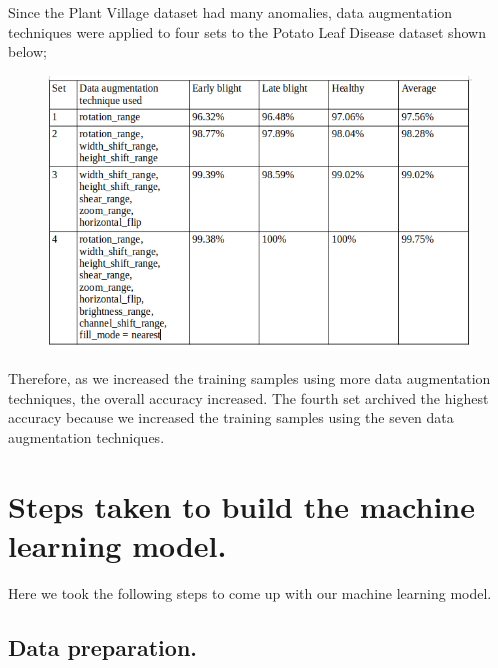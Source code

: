 \documentclass[11pt]{report}
\begin{document}
Since the Plant Village dataset had many anomalies, data augmentation techniques were applied to four sets to the Potato Leaf Disease dataset shown below;\\

\begin{figure}[h]
	\centerline{\small 
		\includegraphics[height=0.3\textheight]  {diag}}
\end{figure}

Therefore, as we increased the training samples using more data augmentation techniques, the overall accuracy increased. The fourth set archived the highest accuracy because we increased the training samples using the seven data augmentation techniques.\\  





\newpage
\section{Steps taken to build the machine learning model.}
Here we took the following steps to come up with our machine learning model.\\

\subsection{Data preparation.}
\end{document}
